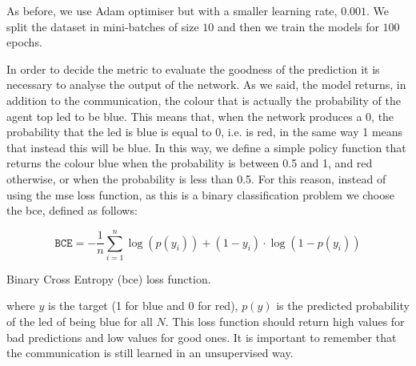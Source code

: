 As before, we use Adam optimiser but with a smaller learning rate, $0.001$. 
We split the dataset in mini-batches of size $10$ and then we train the models for 
$100$ epochs. 

In order to decide the metric to evaluate the goodness of the prediction it is 
necessary to analyse the output of the network. As we said, the model returns, in 
addition to the communication, the colour that is actually the probability of the 
agent top \gls{led} to be blue. This means that, when the network produces a 0, 
the probability that the \gls{led} is blue is equal to 0, i.e. is red, in the same way 1 
means that instead this will be blue. In this way, we define a simple policy function 
that returns the colour blue when the probability is between 0.5 and 1, and red 
otherwise, or when the probability is less than 0.5.
For this reason, instead of using the \gls{mse} loss function, as this is a binary 
classification problem we choose the \gls{bce}, defined as follows:
\begin{Equation}[H]
	\centering
	\begin{equation}
	\mathtt{BCE} = -\frac{1}{n} \sum_{i=1}^n \log(p(y_i)) + (1-y_i) \cdot \log(1 - 
	p(y_i))
	\end{equation}
	\caption{Binary Cross Entropy (\gls{bce}) loss function.}
	\label{eq:bce}
\end{Equation}
where $y$ is the target (1 for blue and 0 for red), $p(y)$ is the predicted 
probability of the \gls{led} of being blue for all $N$.
This loss function should return high values for bad predictions and low values for 
good ones.
It is important to remember that the communication is still learned in an 
unsupervised way.


